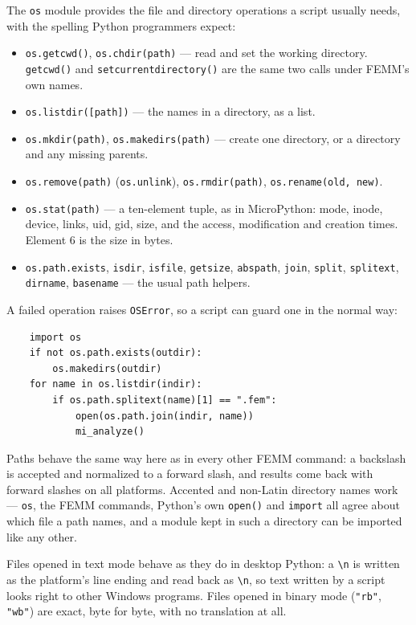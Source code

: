 The {\tt os} module provides the file and directory operations a script
usually needs, with the spelling Python programmers expect:

\begin{itemize}
\item{\tt os.getcwd()}, {\tt os.chdir(path)} --- read and set the working
directory.  {\tt getcwd()} and {\tt setcurrentdirectory()} are the same
two calls under FEMM's own names.
\item{\tt os.listdir([path])} --- the names in a directory, as a list.
\item{\tt os.mkdir(path)}, {\tt os.makedirs(path)} --- create one
directory, or a directory and any missing parents.
\item{\tt os.remove(path)} ({\tt os.unlink}), {\tt os.rmdir(path)},
{\tt os.rename(old, new)}.
\item{\tt os.stat(path)} --- a ten-element tuple, as in MicroPython:
mode, inode, device, links, uid, gid, size, and the access, modification
and creation times.  Element 6 is the size in bytes.
\item{\tt os.path.exists}, {\tt isdir}, {\tt isfile}, {\tt getsize},
{\tt abspath}, {\tt join}, {\tt split}, {\tt splitext}, {\tt dirname},
{\tt basename} --- the usual path helpers.
\end{itemize}

A failed operation raises {\tt OSError}, so a script can guard one in the
normal way:

\begin{verbatim}
    import os
    if not os.path.exists(outdir):
        os.makedirs(outdir)
    for name in os.listdir(indir):
        if os.path.splitext(name)[1] == ".fem":
            open(os.path.join(indir, name))
            mi_analyze()
\end{verbatim}

Paths behave the same way here as in every other FEMM command: a
backslash is accepted and normalized to a forward slash, and results come
back with forward slashes on all platforms.  Accented and non-Latin
directory names work --- {\tt os}, the FEMM commands, Python's own
{\tt open()} and {\tt import} all agree about which file a path names,
and a module kept in such a directory can be imported like any other.

Files opened in text mode behave as they do in desktop Python: a
{\tt \textbackslash n} is written as the platform's line ending and read
back as {\tt \textbackslash n}, so text written by a script looks right
to other Windows programs.  Files opened in binary mode ({\tt "rb"},
{\tt "wb"}) are exact, byte for byte, with no translation at all.

